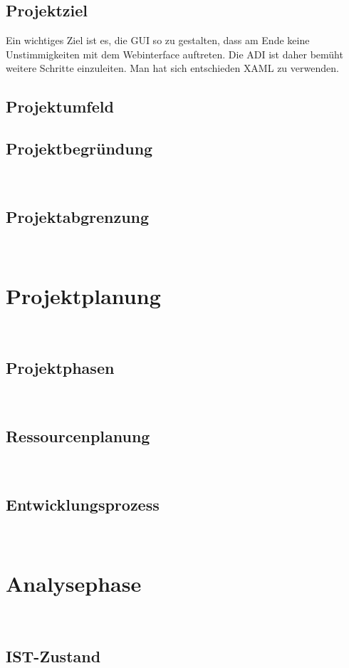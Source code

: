 \documentclass[11pt,toc=sectionentrywithoutdots, headheight=44pt, headings=optiontoheadandtoc]{scrartcl}
\begin{document}
\subsection{Projektziel}
Ein wichtiges Ziel ist es, die \acs{GUI} so zu gestalten, dass am Ende keine Unstimmigkeiten mit dem 
Webinterface auftreten. Die \acs{ADI} ist daher bemüht weitere Schritte einzuleiten. Man hat sich entschieden \acs{XAML} zu verwenden.

\subsection{Projektumfeld}
\blindtext

\subsection{Projektbegründung}
\blindtext\

\subsection{Projektabgrenzung}
\blindtext\

\section{Projektplanung}
\blindtext\

\subsection{Projektphasen}
\blindtext\

\subsection{Ressourcenplanung}
\blindtext\

\subsection{Entwicklungsprozess}
\blindtext\

\section{Analysephase}
\blindtext\

\subsection{IST-Zustand}
\blindtext\
\end{document}
